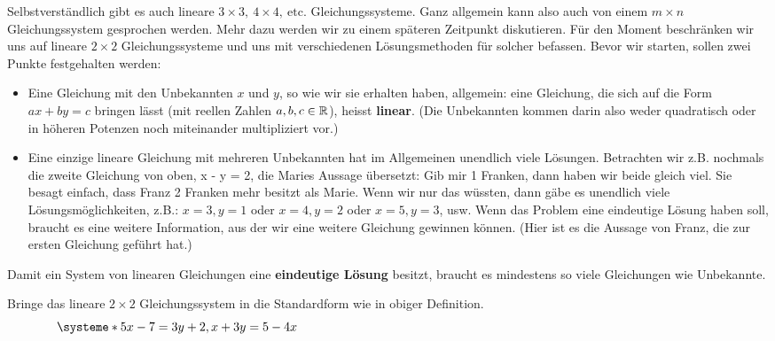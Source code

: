 \documentclass[11pt,oneside]{article}
\begin{document}
	Selbstverständlich gibt es auch lineare $3\times3,\:4\times4,\:\text{etc.}$ Gleichungssysteme. Ganz allgemein kann also auch von einem $m\times n$ Gleichungssystem gesprochen werden. Mehr dazu werden wir zu einem späteren Zeitpunkt diskutieren. Für den Moment beschränken wir uns auf lineare $2\times2$ Gleichungssysteme und uns mit verschiedenen Lösungsmethoden für solcher befassen. Bevor wir starten, sollen zwei Punkte festgehalten werden:
	\begin{itemize}
		\item Eine Gleichung mit den Unbekannten $x$ und $y$, so wie wir sie erhalten haben, allgemein: eine Gleichung, die sich auf die Form $ax + by = c$ bringen lässt (mit reellen Zahlen $a,b,c\in\mathbb{R}$), heisst \textbf{linear}.
		(Die Unbekannten kommen darin also weder quadratisch oder in höheren Potenzen noch miteinander multipliziert vor.)
		\item 	Eine einzige lineare Gleichung mit mehreren Unbekannten hat im Allgemeinen unendlich viele Lösungen.\newline
		Betrachten wir z.B. nochmals die zweite Gleichung von oben, x - y  =  2, die Maries Aussage übersetzt: Gib mir 1 Franken, dann haben wir beide gleich viel. Sie besagt einfach, dass Franz 2 Franken mehr besitzt als Marie. Wenn wir nur das wüssten, dann gäbe es unendlich viele Lösungsmöglichkeiten, z.B.: $x = 3,y = 1$ oder $x = 4,y = 2$ oder $x = 5,y = 3$, usw.\newline
		Wenn das Problem eine eindeutige Lösung haben soll, braucht es eine weitere Information, aus der wir eine weitere Gleichung gewinnen können. (Hier ist es die Aussage von Franz, die zur ersten Gleichung geführt hat.)
	\end{itemize}
	\begin{satz}
		Damit ein System von linearen Gleichungen eine \textbf{eindeutige Lösung} besitzt, braucht es mindestens so viele Gleichungen wie Unbekannte.
	\end{satz}
	\begin{beispiel}
		Bringe das lineare $2\times2$ Gleichungssystem in die Standardform wie in obiger Definition.
		\[\systeme*{5x-7=3y+2,x+3y=5-4x}\hspace*{12cm}\]
	\end{beispiel}
\end{document}
